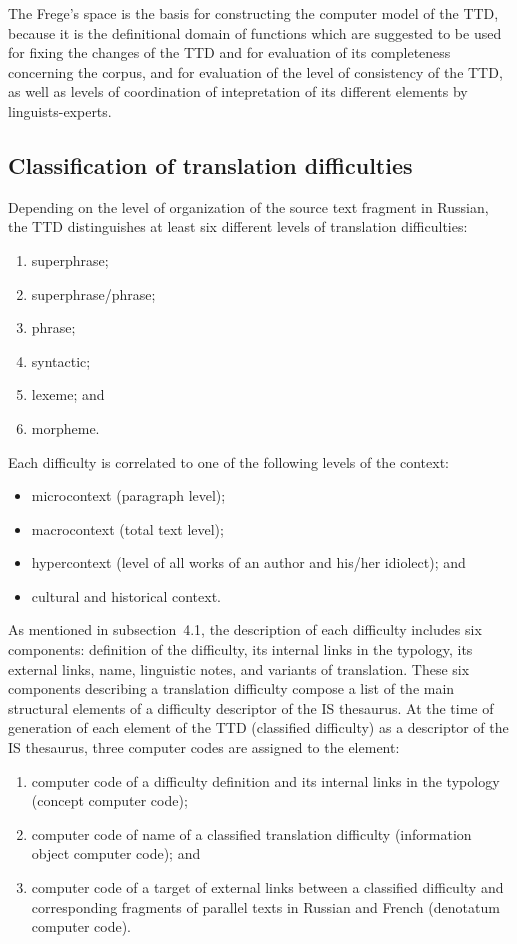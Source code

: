 \begin{multicols}{2}
   The Frege's space is the basis for constructing the computer model of the TTD, because it is 
the \mbox{definitional} domain of functions which are suggested to be used for fixing the changes of the 
TTD and for evaluation of its completeness concerning the corpus, and for evaluation of the level 
of consistency of the TTD, as well as levels of coordination of intepretation of its different 
elements by linguists-experts.

\subsection{Classification of translation difficulties}

\noindent
Depending on the level of organization of the source text fragment in Russian, the TTD 
distinguishes at least six different levels of translation difficulties:
   \begin{enumerate}[(1)]
\item  superphrase;
      \item superphrase/phrase;
      \item phrase;
      \item syntactic;
      \item lexeme; and
      \item morpheme.
      \end{enumerate}
      
   Each difficulty is correlated to one of the following levels of the context:
   \begin{itemize}
      \item  microcontext (paragraph level);
      \item macrocontext (total text level);
      \item hypercontext (level of all works of an author and his/her idiolect); and
      \item cultural and historical context.
      \end{itemize}
      
   As mentioned in subsection~4.1, the description of each difficulty includes six components: 
definition of the difficulty, its internal links in the typology, its external links, name, linguistic 
notes, and variants of \mbox{translation}. These six components describing a translation \mbox{difficulty} 
compose a list of the main structural elements of a difficulty descriptor of the IS \mbox{thesaurus}. At 
the time of generation of each element of the TTD (classified \mbox{difficulty}) as a descriptor of the IS 
\mbox{thesaurus}, three computer codes are assigned to the element:
   \begin{enumerate}[(1)]
\item computer code of a difficulty definition and its internal links in the typology 
(concept computer code);
\item computer code of name of a classified translation difficulty (information object 
computer code); and
\item computer code of a target of external links between a classified difficulty and 
corresponding fragments of parallel texts in Russian and French (denotatum computer 
code).
\end{enumerate}


\end{multicols}
